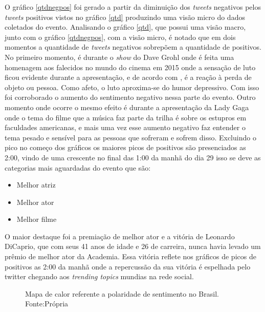 O gráfico \ref{qtdnegpos} foi gerado a partir da diminuição dos \textit{tweets} negativos pelos \textit{tweets} positivos vistos no gráfico \ref{qtd} produzindo uma visão micro do dados coletados do evento. Analisando o gráfico \ref{qtd}, que possui uma visão macro, junto com o gráfico \ref{qtdnegpos}, com a visão micro, é notado que em dois momentos a quantidade de \textit{tweets} negativos sobrepõem a quantidade de positivos. No primeiro momento, é durante o \textit{show} do Dave Grohl onde é feita uma homenagem aos falecidos no mundo do cinema em 2015 onde a sensação de luto ficou evidente durante a apresentação, e de acordo com \cite{freud1908conferencias}, é a reação à perda de objeto ou pessoa. Como afeto, o luto aproxima-se do humor depressivo. Com isso foi corroborado o aumento do sentimento negativo nessa parte do evento. Outro momento onde ocorre o mesmo efeito é durante a apresentação da Lady Gaga onde o tema do filme que a  música faz parte da trilha é sobre os estupros em faculdades americanas, e mais uma vez esse aumento negativo faz entender o tema pesado e sensível para as pessoas que sofreram e sofrem disso. Excluindo o pico no começo dos gráficos os maiores picos de positivos são presenciados as 2:00, vindo de uma crescente no final das 1:00 da manhã do dia 29 isso se deve as categorias mais aguardadas do evento que são:

 \begin{itemize}
 	\item Melhor atriz
 	\item Melhor ator
 	\item Melhor filme
 \end{itemize}

O maior destaque foi a premiação de melhor ator e a vitória de Leonardo DiCaprio, que com seus 41 anos de idade e 26 de carreira, nunca havia levado um prêmio de melhor ator da Academia. Essa vitória reflete nos gráficos de picos de positivos as 2:00 da manhã onde a repercussão da sua vitória é espelhada pelo twitter chegando aos \textit{trending topics} mundias na rede social.


\begin{figure}[!h]
	\centering{}
	\caption{Mapa de calor referente a polaridade de sentimento no Brasil. Fonte:Própria}
	\label{mapa}
\end{figure}